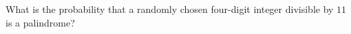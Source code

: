What is the probability that a randomly chosen four-digit integer divisible by $11$ is a palindrome?
